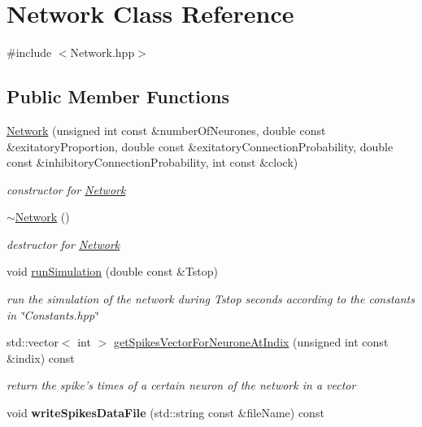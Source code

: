 \hypertarget{classNetwork}{\section{Network Class Reference}
\label{classNetwork}
}


{\ttfamily \#include $<$Network.\-hpp$>$}

\subsection*{Public Member Functions}
\begin{DoxyCompactItemize}
\item 
\hyperlink{classNetwork_a021c9e1c75321f97fe10ff96bad0e1c8}{Network} (unsigned int const \&number\-Of\-Neurones, double const \&exitatory\-Proportion, double const \&exitatory\-Connection\-Probability, double const \&inhibitory\-Connection\-Probability, int const \&clock)
\begin{DoxyCompactList}\small\item\em constructor for \hyperlink{classNetwork}{Network} \end{DoxyCompactList}\item 
\hyperlink{classNetwork_a7a4e19cdb4bf0c7ecf82baa643831492}{$\sim$\-Network} ()
\begin{DoxyCompactList}\small\item\em destructor for \hyperlink{classNetwork}{Network} \end{DoxyCompactList}\item 
void \hyperlink{classNetwork_aee37b42c486581f07111b9346919b1ad}{run\-Simulation} (double const \&Tstop)
\begin{DoxyCompactList}\small\item\em run the simulation of the network during Tstop seconds according to the constants in \char`\"{}\-Constants.\-hpp\char`\"{} \end{DoxyCompactList}\item 
std\-::vector$<$ int $>$ \hyperlink{classNetwork_aab75966da4cbca7c227f98e58a4ac3a5}{get\-Spikes\-Vector\-For\-Neurone\-At\-Indix} (unsigned int const \&indix) const 
\begin{DoxyCompactList}\small\item\em return the spike's times of a certain neuron of the network in a vector \end{DoxyCompactList}\item 
\hypertarget{classNetwork_a3a3dcf8b3bc4ec425ddf6c52a98ded01}{void {\bfseries write\-Spikes\-Data\-File} (std\-::string const \&file\-Name) const }\label{classNetwork_a3a3dcf8b3bc4ec425ddf6c52a98ded01}

\end{DoxyCompactItemize}


